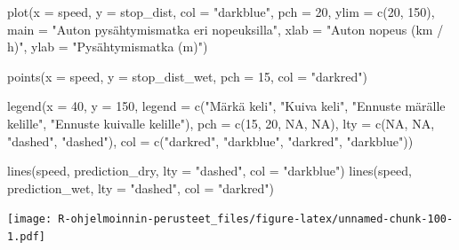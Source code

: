 \documentclass[
]{book}
\newenvironment{Shaded}{\begin{snugshade}}{\end{snugshade}}
\newcommand{\AttributeTok}[1]{\textcolor[rgb]{0.77,0.63,0.00}{#1}}
\newcommand{\ConstantTok}[1]{\textcolor[rgb]{0.00,0.00,0.00}{#1}}
\newcommand{\DecValTok}[1]{\textcolor[rgb]{0.00,0.00,0.81}{#1}}
\newcommand{\FunctionTok}[1]{\textcolor[rgb]{0.00,0.00,0.00}{#1}}
\newcommand{\NormalTok}[1]{#1}
\newcommand{\StringTok}[1]{\textcolor[rgb]{0.31,0.60,0.02}{#1}}
\begin{document}
\begin{Shaded}
\begin{Highlighting}[]
\FunctionTok{plot}\NormalTok{(}\AttributeTok{x =}\NormalTok{ speed, }\AttributeTok{y =}\NormalTok{ stop\_dist,}
     \AttributeTok{col =} \StringTok{"darkblue"}\NormalTok{, }\AttributeTok{pch =} \DecValTok{20}\NormalTok{,}
     \AttributeTok{ylim =} \FunctionTok{c}\NormalTok{(}\DecValTok{20}\NormalTok{, }\DecValTok{150}\NormalTok{),}
     \AttributeTok{main =} \StringTok{"Auton pysähtymismatka eri nopeuksilla"}\NormalTok{,}
     \AttributeTok{xlab =} \StringTok{"Auton nopeus (km / h)"}\NormalTok{, }\AttributeTok{ylab =} \StringTok{"Pysähtymismatka (m)"}\NormalTok{)}

\FunctionTok{points}\NormalTok{(}\AttributeTok{x =}\NormalTok{ speed, }\AttributeTok{y =}\NormalTok{ stop\_dist\_wet, }\AttributeTok{pch =} \DecValTok{15}\NormalTok{, }\AttributeTok{col =} \StringTok{"darkred"}\NormalTok{)}

\FunctionTok{legend}\NormalTok{(}\AttributeTok{x =} \DecValTok{40}\NormalTok{, }\AttributeTok{y =} \DecValTok{150}\NormalTok{,}
       \AttributeTok{legend =} \FunctionTok{c}\NormalTok{(}\StringTok{"Märkä keli"}\NormalTok{, }\StringTok{"Kuiva keli"}\NormalTok{,}
                  \StringTok{"Ennuste märälle kelille"}\NormalTok{,}
                  \StringTok{"Ennuste kuivalle kelille"}\NormalTok{),}
       \AttributeTok{pch =} \FunctionTok{c}\NormalTok{(}\DecValTok{15}\NormalTok{, }\DecValTok{20}\NormalTok{, }\ConstantTok{NA}\NormalTok{, }\ConstantTok{NA}\NormalTok{),}
       \AttributeTok{lty =} \FunctionTok{c}\NormalTok{(}\ConstantTok{NA}\NormalTok{, }\ConstantTok{NA}\NormalTok{, }\StringTok{"dashed"}\NormalTok{, }\StringTok{"dashed"}\NormalTok{),}
       \AttributeTok{col =} \FunctionTok{c}\NormalTok{(}\StringTok{"darkred"}\NormalTok{, }\StringTok{"darkblue"}\NormalTok{, }\StringTok{"darkred"}\NormalTok{, }\StringTok{"darkblue"}\NormalTok{))}

\FunctionTok{lines}\NormalTok{(speed, prediction\_dry, }\AttributeTok{lty =} \StringTok{"dashed"}\NormalTok{, }\AttributeTok{col =} \StringTok{"darkblue"}\NormalTok{)}
\FunctionTok{lines}\NormalTok{(speed, prediction\_wet, }\AttributeTok{lty =} \StringTok{"dashed"}\NormalTok{, }\AttributeTok{col =} \StringTok{"darkred"}\NormalTok{)}
\end{Highlighting}
\end{Shaded}

\texttt{[image: R-ohjelmoinnin-perusteet\_files/figure-latex/unnamed-chunk-100-1.pdf]}
\end{document}
